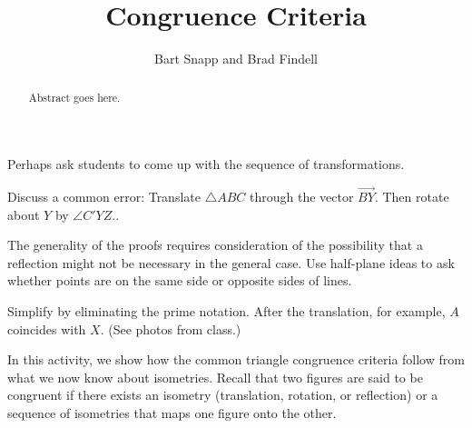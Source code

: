 \documentclass{ximera}
\title{Congruence Criteria}
\author{Bart Snapp and Brad Findell}
\begin{document}
\begin{abstract}
Abstract goes here.  
\end{abstract}
\maketitle

\begin{teachingnote}
Perhaps ask students to come up with the sequence of transformations. 

Discuss a common error:   Translate $\triangle ABC$ through the vector $\overrightarrow{BY}$.  Then rotate about $Y$ by $\angle C'YZ.$. 

The generality of the proofs requires consideration of the possibility that a reflection might not be necessary in the general case.  Use half-plane ideas to ask whether points are on the same side or opposite sides of lines.  

Simplify by eliminating the prime notation.  After the translation, for example, $A$ coincides with $X$.  (See photos from class.)
\end{teachingnote}

In this activity, we show how the common triangle congruence criteria follow from
 what we now know about isometries.%
 Recall that two figures are said to be 
congruent if there exists an isometry (translation, rotation, or reflection) or a 
sequence of isometries that maps one figure onto the other.  
\end{document}
